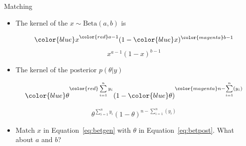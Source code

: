\documentclass[10pt]{beamer}
\begin{document}
\begin{frame}{Matching}
  \begin{itemize}
  \item The kernel of the $x\sim\mbox{Beta}(a,b)$ is


    {\begin{equation}
        {\color{blue} x}^{{\color{red} a-1}}(1-{\color{blue} x})^{{\color{magenta} b-1}}
        \label{eq:betgen}
      \end{equation}}
    \begin{equation}
      x^{a-1}(1-x)^{b-1}
      \label{eq:betgen}
    \end{equation}

  \item The kernel of the posterior $p(\theta|y)$

    \begin{equation}
      {\color{blue} \theta}^{{\color{red}\sum\limits_{i=1}^ny_i}}(1-{\color{blue} \theta})^{{\color{magenta} n-\sum\limits_{i=1}^n(y_i)}}
      \label{eq:betpost}
    \end{equation}

    \begin{equation}
      \theta^{\sum\limits_{i=1}^ny_i}(1-\theta)^{n-\sum\limits_{i=1}^n(y_i)}
      \label{eq:betpost}
    \end{equation}

  \item Match $x$ in Equation~\ref{eq:betgen} with $\theta$ in Equation~\ref{eq:betpost}. What about $a$ and $b$?

  \end{itemize}
\end{frame}
\end{document}
